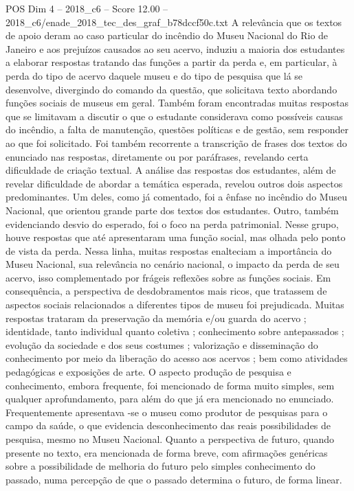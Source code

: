 \begin{textsample}{POS Dim 4 – 2018\_c6 – Score 12.00 – 2018\_c6/enade\_2018\_tec\_des\_graf\_b78dccf50c.txt}
A relevância que os textos de apoio deram ao caso particular do incêndio do Museu Nacional do Rio de Janeiro e aos prejuízos causados ao seu acervo, induziu a maioria dos estudantes a elaborar respostas tratando das funções a partir da perda e, em particular, à perda do tipo de acervo daquele museu e do tipo de pesquisa que lá se desenvolve, divergindo do comando da questão, que solicitava texto abordando funções sociais de museus em geral.
Também foram encontradas muitas respostas que se limitavam a discutir o que o estudante considerava como possíveis causas do incêndio, a falta de manutenção, questões políticas e de gestão, sem responder ao que foi solicitado.
Foi também recorrente a transcrição de frases dos textos do enunciado nas respostas, diretamente ou por paráfrases, revelando certa dificuldade de criação textual.
A análise das respostas dos estudantes, além de revelar dificuldade de abordar a temática esperada, revelou outros dois aspectos predominantes.
Um deles, como já comentado, foi a ênfase no incêndio do Museu Nacional, que orientou grande parte dos textos dos estudantes.
Outro, também evidenciando desvio do esperado, foi o foco na perda patrimonial.
Nesse grupo, houve respostas que até apresentaram uma função social, mas olhada pelo ponto de vista da perda.
Nessa linha, muitas respostas enalteciam a importância do Museu Nacional, sua relevância no cenário nacional, o impacto da perda de seu acervo, isso complementado por frágeis reflexões sobre as funções sociais.
Em consequência, a perspectiva de desdobramentos mais ricos, que tratassem de aspectos sociais relacionados a diferentes tipos de museu foi prejudicada.
Muitas respostas trataram da preservação da memória e/ou guarda do acervo ; identidade, tanto individual quanto coletiva ; conhecimento sobre antepassados ; evolução da sociedade e dos seus costumes ; valorização e disseminação do conhecimento por meio da liberação do acesso aos acervos ; bem como atividades pedagógicas e exposições de arte.
O aspecto produção de pesquisa e conhecimento, embora frequente, foi mencionado de forma muito simples, sem qualquer aprofundamento, para além do que já era mencionado no enunciado.
Frequentemente apresentava -se o museu como produtor de pesquisas para o campo da saúde, o que evidencia desconhecimento das reais possibilidades de pesquisa, mesmo no Museu Nacional.
Quanto a perspectiva de futuro, quando presente no texto, era mencionada de forma breve, com afirmações genéricas sobre a possibilidade de melhoria do futuro pelo simples conhecimento do passado, numa percepção de que o passado determina o futuro, de forma linear.

\end{textsample}
